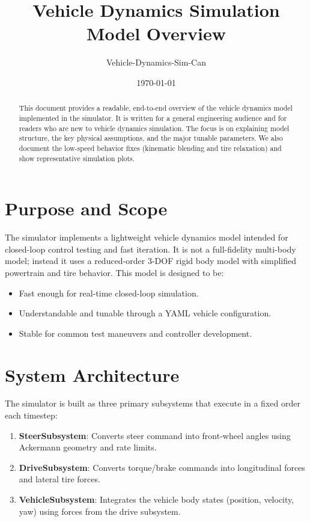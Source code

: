 \documentclass[11pt]{article}
\title{Vehicle Dynamics Simulation Model Overview}
\author{Vehicle-Dynamics-Sim-Can}
\date{\today}
\begin{document}
\maketitle

\begin{abstract}
This document provides a readable, end-to-end overview of the vehicle dynamics model implemented in the simulator. It is written for a general engineering audience and for readers who are new to vehicle dynamics simulation. The focus is on explaining model structure, the key physical assumptions, and the major tunable parameters. We also document the low-speed behavior fixes (kinematic blending and tire relaxation) and show representative simulation plots.
\end{abstract}

\tableofcontents
\newpage

\section{Purpose and Scope}
The simulator implements a lightweight vehicle dynamics model intended for closed-loop control testing and fast iteration. It is not a full-fidelity multi-body model; instead it uses a reduced-order 3-DOF rigid body model with simplified powertrain and tire behavior. This model is designed to be:

\begin{itemize}
\item Fast enough for real-time closed-loop simulation.
\item Understandable and tunable through a YAML vehicle configuration.
\item Stable for common test maneuvers and controller development.
\end{itemize}

\section{System Architecture}
The simulator is built as three primary subsystems that execute in a fixed order each timestep:

\begin{enumerate}
\item \textbf{SteerSubsystem}: Converts steer command into front-wheel angles using Ackermann geometry and rate limits.
\item \textbf{DriveSubsystem}: Converts torque/brake commands into longitudinal forces and lateral tire forces.
\item \textbf{VehicleSubsystem}: Integrates the vehicle body states (position, velocity, yaw) using forces from the drive subsystem.
\end{enumerate}
\end{document}
